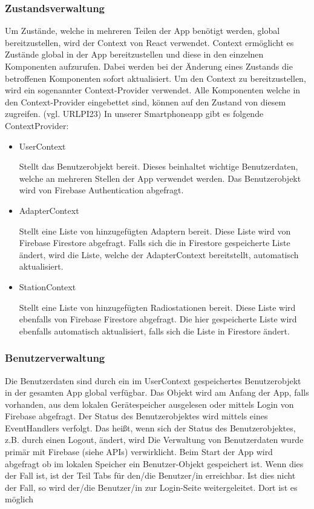 \documentclass[11pt, twoside]{article}
\begin{document}
\subsubsection{Zustandsverwaltung}
Um Zustände, welche in mehreren Teilen der App benötigt werden, global bereitzustellen, wird der Context von React verwendet. Context ermöglicht es Zustände global in der App bereitzustellen und diese in den einzelnen Komponenten aufzurufen. Dabei werden bei der Änderung eines Zustands die betroffenen Komponenten sofort aktualisiert. Um den Context zu bereitzustellen, wird ein sogenannter Context-Provider verwendet. Alle Komponenten welche in den Context-Provider eingebettet sind, können auf den Zustand von diesem zugreifen. (vgl. URLPI23) In unserer Smartphoneapp gibt es folgende ContextProvider:
\begin{itemize}
	\item UserContext
	\par Stellt das Benutzerobjekt bereit. Dieses beinhaltet wichtige Benutzerdaten, welche an mehreren Stellen der App verwendet werden. Das Benutzerobjekt wird von Firebase Authentication abgefragt.
	\item AdapterContext
	\par Stellt eine Liste von hinzugefügten Adaptern bereit. Diese Liste wird von Firebase Firestore abgefragt. Falls sich die in Firestore gespeicherte Liste ändert, wird die Liste, welche der AdapterContext bereitstellt, automatisch aktualisiert. 
	\item StationContext
	\par Stellt eine Liste von hinzugefügten Radiostationen bereit. Diese Liste wird ebenfalls von Firebase Firestore abgefragt. Die hier gespeicherte Liste wird ebenfalls automatisch aktualisiert, falls sich die Liste in Firestore ändert.
\end{itemize}
\subsubsection{Benutzerverwaltung}
Die Benutzerdaten sind durch ein im UserContext gespeichertes Benutzerobjekt in der gesamten App global verfügbar. Das Objekt wird am Anfang der App, falls vorhanden, aus dem lokalen Gerätespeicher ausgelesen oder mittels Login von Firebase abgefragt. Der Status des Benutzerobjektes wird mittels eines EventHandlers verfolgt. Das heißt, wenn sich der Status des Benutzerobjektes, z.B. durch einen Logout, ändert, wird 
Die Verwaltung von Benutzerdaten wurde primär mit Firebase (siehe APIs) verwirklicht. Beim Start der App wird abgefragt ob im lokalen Speicher ein Benutzer-Objekt gespeichert ist. Wenn dies der Fall ist, ist der Teil Tabs für den/die Benutzer/in erreichbar. Ist dies nicht der Fall, so wird der/die Benutzer/in zur Login-Seite weitergeleitet. Dort ist es möglich 
\end{document}
